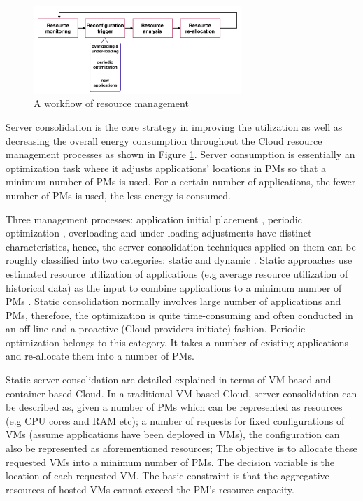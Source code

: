 \begin{figure}
	\centering
	\includegraphics[width=0.7\textwidth]{pics/workflow_management.png}
	\caption{A workflow of resource management \cite{Mishra:2012kx}}
	\label{fig:workflow}
\end{figure}

Server consolidation \cite{Varasteh:2015fu} is the core strategy in improving the utilization as well as decreasing the overall energy consumption throughout the Cloud resource management processes as shown in Figure \ref{fig:workflow}. Server consumption is essentially an optimization task where it adjusts applications' locations in PMs so that a minimum number of PMs is used. For a certain number of applications, the fewer number of PMs is used, the less energy is consumed. 

Three management processes: application initial placement \cite{Jennings:2015ht}, periodic optimization \cite{Mishra:2012kx}, overloading and under-loading adjustments \cite{Mishra:2012kx} have distinct characteristics, hence, the server consolidation techniques applied on them can be roughly classified into two categories: static \cite{Xiao:2015ik} and dynamic \cite{Beloglazov:2012bw}.
Static approaches use estimated resource utilization of applications (e.g average resource utilization of historical data) as the input to combine applications to a minimum number of PMs \cite{Mishra:2012kx}. Static consolidation normally involves large number of applications and PMs, therefore, the optimization is quite time-consuming and often conducted in an off-line and a proactive (Cloud providers initiate) fashion. Periodic optimization belongs to this category. It takes a number of existing applications and re-allocate them into a number of PMs. 

Static server consolidation are detailed explained in terms of VM-based and container-based Cloud. In a traditional VM-based Cloud, server consolidation can be described as, given a number of  PMs which can be represented as resources (e.g CPU cores and RAM etc); a number of requests for fixed configurations of VMs (assume applications have been deployed in VMs), the configuration can also be represented as aforementioned resources; The objective is to allocate these requested VMs into a minimum number of PMs. The decision variable is the location of each requested VM. The basic constraint is that the aggregative resources  of hosted VMs cannot exceed the PM's resource capacity. 


